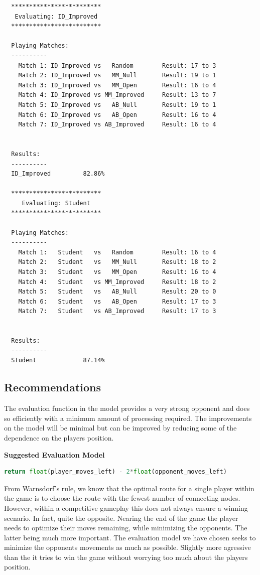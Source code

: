 \documentclass{article}
\begin{document}
\begin{verbatim}
  *************************
   Evaluating: ID_Improved
  *************************

  Playing Matches:
  ----------
    Match 1: ID_Improved vs   Random    	Result: 17 to 3
    Match 2: ID_Improved vs   MM_Null   	Result: 19 to 1
    Match 3: ID_Improved vs   MM_Open   	Result: 16 to 4
    Match 4: ID_Improved vs MM_Improved 	Result: 13 to 7
    Match 5: ID_Improved vs   AB_Null   	Result: 19 to 1
    Match 6: ID_Improved vs   AB_Open   	Result: 16 to 4
    Match 7: ID_Improved vs AB_Improved 	Result: 16 to 4


  Results:
  ----------
  ID_Improved         82.86%

  *************************
     Evaluating: Student
  *************************

  Playing Matches:
  ----------
    Match 1:   Student   vs   Random    	Result: 16 to 4
    Match 2:   Student   vs   MM_Null   	Result: 18 to 2
    Match 3:   Student   vs   MM_Open   	Result: 16 to 4
    Match 4:   Student   vs MM_Improved 	Result: 18 to 2
    Match 5:   Student   vs   AB_Null   	Result: 20 to 0
    Match 6:   Student   vs   AB_Open   	Result: 17 to 3
    Match 7:   Student   vs AB_Improved 	Result: 17 to 3


  Results:
  ----------
  Student             87.14%
\end{verbatim}

\subsection{Recommendations}

The evaluation function in the \texttt{} model provides a very strong opponent and does so efficiently with a minimum amount of processing required. The improvements on the model will be minimal but can be improved by reducing some of the dependence on the players position.\newline

\textbf{Suggested Evaluation Model}\newline

\begin{lstlisting}[language = python]
  return float(player_moves_left) - 2*float(opponent_moves_left)
\end{lstlisting}

From Warnsdorf's rule, we know that the optimal route for a single player within the game is to choose the route with the fewest number of connecting nodes. However, within a competitive gameplay this does not always ensure a winning scenario. In fact, quite the opposite. Nearing the end of the game the player needs to optimize their moves remaining, while minimizing the opponents. The latter being much more important. The evaluation model we have chosen seeks to minimize the opponents movements as much as possible. Slightly more agressive than the \texttt{} it tries to win the game without worrying too much about the players position.
\end{document}
